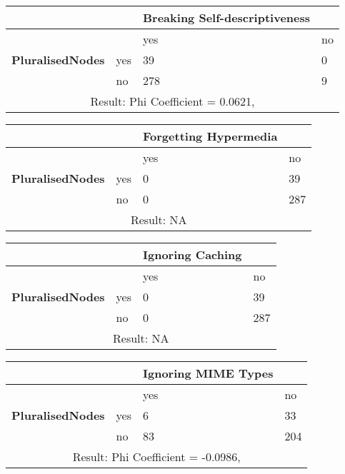 \documentclass[a4paper,12pt]{article}
\begin{document}
\begin{center}
  \begin{tabular}{| p{60mm} | p{10mm} | p{35mm} | p{35mm} |}
  \hline
   & & \textbf{Breaking Self-descriptiveness} &
  \\
  \hline
  & & yes & no
  \\
  \hline
  \textbf{PluralisedNodes} & yes & 39 & 0
  \\
  \hline
   & no & 278 & 9
  \\
  \hline
  \multicolumn{4}{|c|}{Result: Phi Coefficient = 0.0621, }
  \\ \hline
  \end{tabular}
  \end{center}

\begin{center}
  \begin{tabular}{| p{60mm} | p{10mm} | p{35mm} | p{35mm} |}
  \hline
   & & \textbf{Forgetting Hypermedia} &
  \\
  \hline
  & & yes & no
  \\
  \hline
  \textbf{PluralisedNodes} & yes & 0 & 39
  \\
  \hline
   & no & 0 & 287
  \\
  \hline
  \multicolumn{4}{|c|}{Result: NA}
  \\ \hline
  \end{tabular}
  \end{center}

\begin{center}
  \begin{tabular}{| p{60mm} | p{10mm} | p{35mm} | p{35mm} |}
  \hline
   & & \textbf{Ignoring Caching} &
  \\
  \hline
  & & yes & no
  \\
  \hline
  \textbf{PluralisedNodes} & yes & 0 & 39
  \\
  \hline
   & no & 0 & 287
  \\
  \hline
  \multicolumn{4}{|c|}{Result: NA}
  \\ \hline
  \end{tabular}
  \end{center}

\begin{center}
  \begin{tabular}{| p{60mm} | p{10mm} | p{35mm} | p{35mm} |}
  \hline
   & & \textbf{Ignoring MIME Types} &
  \\
  \hline
  & & yes & no
  \\
  \hline
  \textbf{PluralisedNodes} & yes & 6 & 33
  \\
  \hline
   & no & 83 & 204
  \\
  \hline
  \multicolumn{4}{|c|}{Result: Phi Coefficient = -0.0986, }
  \\ \hline
  \end{tabular}
  \end{center}
\end{document}
